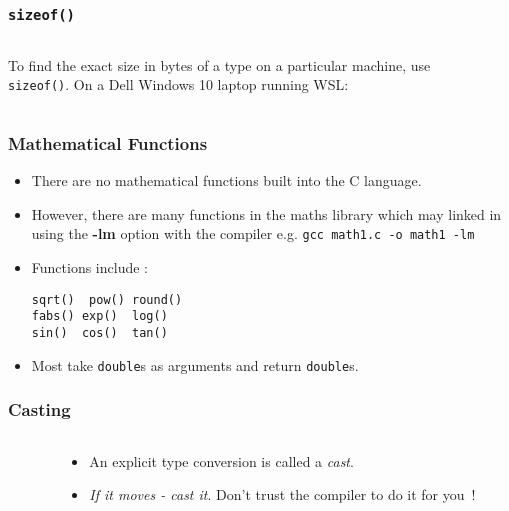 \begin{frame}[fragile]
\frametitle{\tt sizeof()}

\begin{columns}

\begin{column}{0.45\textwidth}
To find the exact size in bytes of a type on a particular machine,
use {\tt sizeof()}. On a Dell Windows 10 laptop running WSL:

\end{column}

\pause
\begin{column}{0.40\textwidth}
\end{column}

\end{columns}
\end{frame} 


\begin{frame}[fragile]
\frametitle{Mathematical Functions}

\begin{itemize}[<+->]
\item There are no mathematical functions built into the C language.
\item However, there are many functions in the maths library
which may linked in using the {\bf -lm} option with the compiler e.g. {\tt gcc math1.c -o math1 -lm}
\item Functions include :
\begin{verbatim}
sqrt()  pow() round() 
fabs() exp()  log()
sin()  cos()  tan()
\end{verbatim}
\item Most take {\tt double}s as arguments and return {\tt double}s.
\end{itemize}

\end{frame}


\begin{frame}[fragile]
\frametitle{Casting}
\begin{columns}

\begin{column}{0.45\textwidth}

\end{column}

\begin{column}{0.45\textwidth}
\begin{itemize}[<+->]
\item An explicit type conversion is called a {\it cast}.
\item {\it If it moves - cast it}. Don't trust the compiler to do it for you~!
\end{itemize}
\end{column}


\end{columns}
\end{frame}

